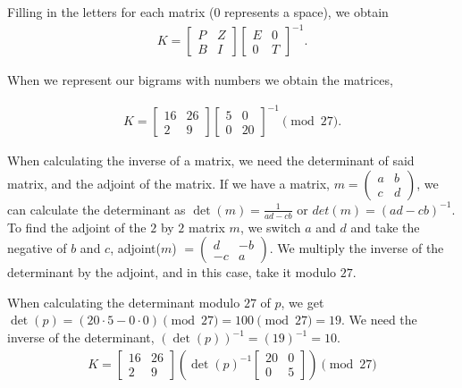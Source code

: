\documentclass{article}
\begin{document}
Filling in the letters for each matrix ($0$ represents a space), we obtain 
\begin{align*}
    K =
    \begin{bmatrix}
        P & Z\\
        B & I 
    \end{bmatrix}
    \begin{bmatrix}
        E & 0\\
        0 & T
    \end{bmatrix}
    ^{-1}.
\end{align*}

When we represent our bigrams with numbers we obtain the matrices,

\begin{align*}
    K = 
    \begin{bmatrix}
        16 & 26\\
        2 & 9
    \end{bmatrix}
    \begin{bmatrix}
        5 & 0\\
        0 & 20
    \end{bmatrix}
    ^{-1} \pmod {27}.
\end{align*}

\par When calculating the inverse of a matrix, we need the determinant of said matrix, and the adjoint of the matrix. If we have a matrix, $m =
\left(\begin{smallmatrix}
    a & b\\
    c & d
\end{smallmatrix}\right)$, we can calculate the determinant as $\det(m) = \frac{1}{ad-cb}$ or $det(m) = (ad-cb)^{-1}$. To find the adjoint of the $2$ by $2$ matrix $m$, we switch $a$ and $d$ and take the negative of $b$ and $c$, adjoint($m$) $= 
\left(\begin{smallmatrix}
    d & -b\\
    -c & a
\end{smallmatrix}\right)$.
We multiply the inverse of the determinant by the adjoint, and in this case, take it modulo $27$.
\par When calculating the determinant modulo $27$ of $p$, we get $\det(p) = (20 \cdot 5 - 0 \cdot 0)\pmod{27} = 100\pmod{27} = 19$. We need the inverse of the determinant, $(\det(p))^{-1} = (19)^{-1} = 10$.
\begin{align*}
    K = 
    \begin{bmatrix}
        16 & 26\\
        2 & 9
    \end{bmatrix}
    \left( \det (p)^{-1}
    \begin{bmatrix}
        20 & 0\\
        0 & 5
    \end{bmatrix}
    \right) \pmod {27}
\end{align*}
\end{document}
